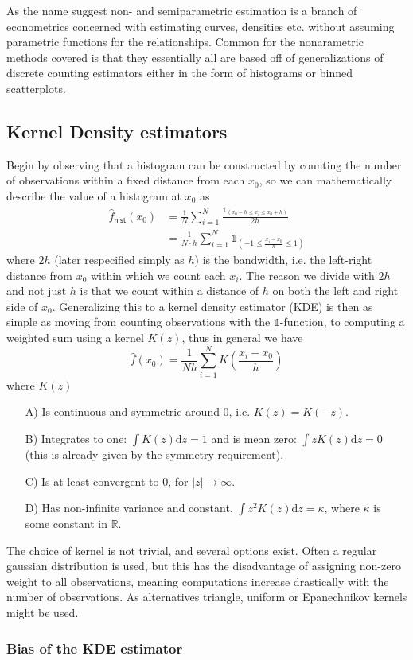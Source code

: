 As the name suggest non- and semiparametric estimation is a branch of econometrics concerned with estimating curves, densities etc. without assuming parametric functions for the relationships. Common for the nonarametric methods covered is that they essentially all are based off of generalizations of discrete counting estimators either in the form of histograms or binned scatterplots.

\subsection{Kernel Density estimators}
Begin by observing that a histogram can be constructed by counting the number of observations within a fixed distance from each $x_0$, so we can mathematically describe the value of a histogram at $x_0$ as
\begin{equation}
  \begin{split}
  \hat{f}_{\textsf{hist}}(x_0) &= \frac{1}{N} \sum_{i=1}^N \frac{\mathds{1}_{(x_0 - h \leq x_i \leq x_0 + h)}}{2h} \\
  & = \frac{1}{N\cdot h} \sum_{i=1}^N \mathds{1}_{\left(-1 \leq \frac{x_i - x_0}{h} \leq 1 \right)}
\end{split}
\end{equation}
where $2h$ (later respecified simply as $h$) is the bandwidth, i.e. the left-right distance from $x_0$ within which we count each $x_i$. The reason we divide with $2h$ and not just $h$ is that we count within a distance of $h$ on both the left and right side of $x_0$. Generalizing this to a kernel density estimator (KDE) is then as simple as moving from counting observations with the $\mathds{1}$-function, to computing a weighted sum using a kernel $K(z)$, thus in general we have
\begin{equation}
  \hat{f}(x_0) = \frac{1}{Nh} \sum_{i=1}^N K\left( \frac{x_i - x_0}{h} \right)
\end{equation}
where $K(z)$
\begin{itemize}
  \item[A)] Is continuous and symmetric around 0, i.e. $K(z)=K(-z)$.
  \item[B)] Integrates to one: $\int K(z) \textrm{d}z = 1$ and is mean zero: $\int z K(z) \textrm{d}z= 0$ (this is already given by the symmetry requirement).
  \item[C)] Is at least convergent to 0, for $|z|\rightarrow \infty$.
  \item[D)] Has non-infinite variance and constant, $\int z^2 K(z)\textrm{d}z = \kappa$, where $\kappa$ is some constant in $\mathbb{R}$.
\end{itemize}
The choice of kernel is not trivial, and several options exist. Often a regular gaussian distribution is used, but this has the disadvantage of assigning non-zero weight to all observations, meaning computations increase drastically with the number of observations. As alternatives triangle, uniform or Epanechnikov kernels might be used.

\subsubsection{Bias of the KDE estimator}
